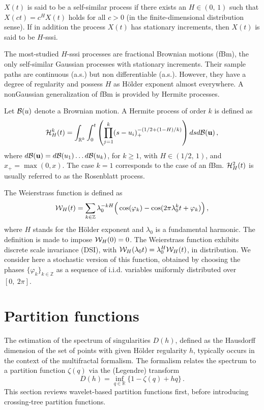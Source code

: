 \documentclass[a4paper]{article}
\newcommand{\R}{\mathbb{R}}
\newcommand{\Z}{\mathbb{Z}}
\begin{document}
\medskip

 $X(t)$ is said to be a self-similar process if there exists an $H\in(0,\,1)$ such that  $X(ct)=c^H X(t)$ holds for all $c>0$ (in the finite-dimensional distribution sense). 
If in addition the process $X(t)$ has stationary increments, then $X(t)$ is said to be $H$-sssi.

The most-studied $H$-sssi processes are fractional Brownian motions (fBm), 
the only self-similar Gaussian processes with stationary increments.
Their sample paths are continuous (a.s.) but non differentiable (a.s.). However, they have a degree of regularity 
and possess $H$ as  H\"older exponent almost everywhere. 
A nonGaussian generalization of fBm is provided by Hermite processes.

Let ${\cal B}(u)$ denote a Brownian motion.
A Hermite process of order $k$ is defined as
\begin{align*}
{\cal H}^k_H(t) = \int_{\R^k}\int_0^t \left( \prod_{j=1}^k (s-u_i)_+^{-(1/2 + (1-H)/k)}\right)dsd{\cal B}({\bf u})\,,%
\end{align*}
where $d{\cal B}({\bf u})=d{\cal B}(u_1)\hdots d{\cal B}(u_k)$,
for $k\geq 1$, with $H\in(1/2,\,1)$, and $x_+=\max(0,x)$.
The case $k=1$ corresponds to the case of an fBm.
${\cal H}^2_H(t)$ is usually referred to as the Rosenblatt process.

The Weierstrass function is defined as
\[
{\cal W}_H(t)= \sum_{k\in \Z} \lambda_0^{-k H} \Big(\cos(\varphi_k)-\cos(2\pi \lambda_0^k t +\varphi_k) \Big)\,,
\]
where $H$ stands for the H\"older exponent and $\lambda_0$ is a fundamental harmonic. 
The definition is made to impose ${\cal W}_H(0)=0$. 
The Weierstrass function exhibits discrete scale invariance (DSI), with ${\cal W}_H(\lambda_0 t)=\lambda_0^H {\cal W}_H(t)$, in distribution.
We consider here a stochastic version of this function, obtained by choosing the phases $\{\varphi_k\}_{k\in \Z}$ as a sequence of i.i.d. variables uniformly distributed over $[0,~2\pi]$. 




\section{Partition functions}
\label{sec:majhead}

The estimation of the spectrum of singularities $D(h)$, defined as the Hausdorff dimension of the set of points with given H\"older regularity $h$, typically occurs in the context of the multifractal formalism.
The formalism relates the spectrum to a partition function $\zeta(q)$ via the (Legendre) transform
\[
D(h) = \inf\limits_{q\in\R} \{ 1- \zeta(q) + hq \}\,.
\]
This section reviews wavelet-based partition functions first, before introducing crossing-tree partition functions.
\end{document}

